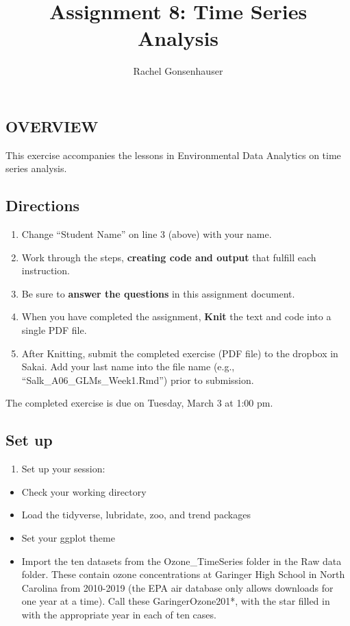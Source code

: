 \documentclass[]{article}
\title{Assignment 8: Time Series Analysis}
\author{Rachel Gonsenhauser}
\date{}
\providecommand{\tightlist}{%
  \setlength{\itemsep}{0pt}\setlength{\parskip}{0pt}}
\begin{document}
\maketitle

\hypertarget{overview}{%
\subsection{OVERVIEW}\label{overview}}

This exercise accompanies the lessons in Environmental Data Analytics on
time series analysis.

\hypertarget{directions}{%
\subsection{Directions}\label{directions}}

\begin{enumerate}
\def\labelenumi{\arabic{enumi}.}
\tightlist
\item
  Change ``Student Name'' on line 3 (above) with your name.
\item
  Work through the steps, \textbf{creating code and output} that fulfill
  each instruction.
\item
  Be sure to \textbf{answer the questions} in this assignment document.
\item
  When you have completed the assignment, \textbf{Knit} the text and
  code into a single PDF file.
\item
  After Knitting, submit the completed exercise (PDF file) to the
  dropbox in Sakai. Add your last name into the file name (e.g.,
  ``Salk\_A06\_GLMs\_Week1.Rmd'') prior to submission.
\end{enumerate}

The completed exercise is due on Tuesday, March 3 at 1:00 pm.

\hypertarget{set-up}{%
\subsection{Set up}\label{set-up}}

\begin{enumerate}
\def\labelenumi{\arabic{enumi}.}
\tightlist
\item
  Set up your session:
\end{enumerate}

\begin{itemize}
\tightlist
\item
  Check your working directory
\item
  Load the tidyverse, lubridate, zoo, and trend packages
\item
  Set your ggplot theme
\item
  Import the ten datasets from the Ozone\_TimeSeries folder in the Raw
  data folder. These contain ozone concentrations at Garinger High
  School in North Carolina from 2010-2019 (the EPA air database only
  allows downloads for one year at a time). Call these
  GaringerOzone201*, with the star filled in with the appropriate year
  in each of ten cases.
\end{itemize}
\end{document}
